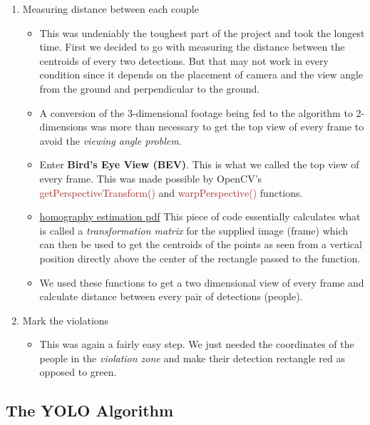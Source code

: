 \documentclass[a4paper]{article}
\begin{document}
\begin{enumerate}
    \item Measuring distance between each couple
          \begin{itemize}
              \item This was undeniably the toughest part of the project and took the longest time. First we decided to go with measuring the distance between the centroids of every two detections. But that may not work in every condition since it depends on the placement of camera and the view angle from the ground and perpendicular to the ground.
              \item A conversion of the 3-dimensional footage being fed to the algorithm to 2-dimensions was more than necessary to get the top view of every frame to avoid the \textit{viewing angle problem}.
              \item Enter \textbf{Bird's Eye View (BEV)}. This is what we called the top view of every frame. This was made possible by OpenCV's \textcolor{brown}{getPerspectiveTransform()} and \textcolor{brown}{warpPerspective()} functions.
                    
              \item \textcolor{green}{\href{https://cseweb.ucsd.edu/classes/wi07/cse252a/homography_estimation/homography_estimation.pdf}{homography estimation pdf}} This piece of code essentially calculates what is called a \textit{transformation matrix}  for the supplied image (frame) which can then be used to get the centroids of the points as seen from a vertical position directly above the center of the rectangle passed to the function.
                    
              \item We used these functions to get a two dimensional view of every frame and calculate distance between every pair of detections (people).
          \end{itemize}

    \item Mark the violations
          \begin{itemize}[label={}]
              \item This was again a fairly easy step. We just needed the coordinates of the people in the \textit{violation zone} and make their detection rectangle red as opposed to green.
          \end{itemize}
\end{enumerate}

\subsection{The YOLO Algorithm}
\end{document}
